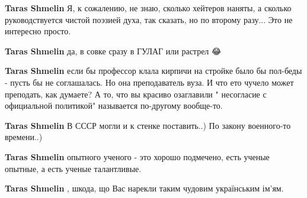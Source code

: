 \begin{itemize}
\begin{itemize}
 
\textbf{Taras Shmelin} Я, к сожалению, не знаю, сколько хейтеров наняты, а сколько руководствуется чистой поэзией духа, так сказать, но по второму разу... Это не интересно просто.

 
\textbf{Taras Shmelin} да, в совке сразу в ГУЛАГ или растрел 😂

 
\textbf{Taras Shmelin} если бы профессор клала кирпичи на стройке было бы пол-беды - пусть бы не соглашалась. Но она преподаватель вуза. И что ето чучело может преподать, как думаете? А то, что вы красиво озаглавили " несогласие с официальной политикой" называется по-другому вообще-то.

 
\textbf{Taras Shmelin} В СССР могли и к стенке поставить..) По закону военного-то времени..)

 
\textbf{Taras Shmelin} опытного ученого - это хорошо подмечено, есть ученые опытные, а есть ученые талантливые.

 
\textbf{Taras Shmelin} , шкода, що Вас нарекли таким чудовим українським ім'ям. 😤😤😤


\end{itemize}
\end{itemize}

